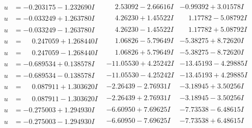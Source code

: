 \documentclass[1p]{elsarticle_modified}
\theoremstyle{definition}
\begin{document}
$$\begin{array}{c|c|c}
\begin{aligned}
u &= -0.203175 - 1.232690 I\end{aligned}
 & \phantom{-}2.53092 - 2.66616 I & -0.99392 + 3.01578 I \\ \hline\begin{aligned}
u &= -0.033249 + 1.263780 I\end{aligned}
 & \phantom{-}4.26230 + 1.45522 I & \phantom{-}1.17782 - 5.08792 I \\ \hline\begin{aligned}
u &= -0.033249 - 1.263780 I\end{aligned}
 & \phantom{-}4.26230 - 1.45522 I & \phantom{-}1.17782 + 5.08792 I \\ \hline\begin{aligned}
u &= \phantom{-}0.247059 + 1.268440 I\end{aligned}
 & \phantom{-}1.06826 - 5.79649 I & -5.38275 + 8.72620 I \\ \hline\begin{aligned}
u &= \phantom{-}0.247059 - 1.268440 I\end{aligned}
 & \phantom{-}1.06826 + 5.79649 I & -5.38275 - 8.72620 I \\ \hline\begin{aligned}
u &= -0.689534 + 0.138578 I\end{aligned}
 & -11.05530 + 4.25242 I & -13.45193 - 4.29885 I \\ \hline\begin{aligned}
u &= -0.689534 - 0.138578 I\end{aligned}
 & -11.05530 - 4.25242 I & -13.45193 + 4.29885 I \\ \hline\begin{aligned}
u &= \phantom{-}0.087911 + 1.303620 I\end{aligned}
 & -2.26439 - 2.76931 I & -3.18945 + 3.50256 I \\ \hline\begin{aligned}
u &= \phantom{-}0.087911 - 1.303620 I\end{aligned}
 & -2.26439 + 2.76931 I & -3.18945 - 3.50256 I \\ \hline\begin{aligned}
u &= -0.275003 + 1.294930 I\end{aligned}
 & -6.60950 + 7.69625 I & -7.73538 - 6.48615 I \\ \hline\begin{aligned}
u &= -0.275003 - 1.294930 I\end{aligned}
 & -6.60950 - 7.69625 I & -7.73538 + 6.48615 I \\ \hline\begin{aligned}

\end{aligned}
\end{array}$$
\end{document}
